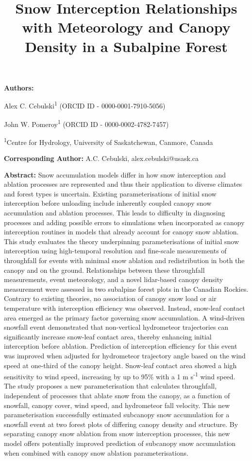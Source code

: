 \documentclass[
  letterpaper,
  DIV=11,
  numbers=noendperiod]{scrartcl}
\title{Snow Interception Relationships with Meteorology and Canopy
Density in a Subalpine Forest}
\author{}
\date{}
\begin{document}
\maketitle



\textbf{Authors:}

Alex C. Cebulski\textsuperscript{1} (ORCID ID - 0000-0001-7910-5056)

John W. Pomeroy\textsuperscript{1} (ORCID ID - 0000-0002-4782-7457)

\textsuperscript{1}Centre for Hydrology, University of Saskatchewan,
Canmore, Canada

\textbf{Corresponding Author:} A.C. Cebulski, alex.cebulski@usask.ca

\textbf{Abstract:} Snow accumulation models differ in how snow
interception and ablation processes are represented and thus their
application to diverse climates and forest types is uncertain. Existing
parameterisations of initial snow interception before unloading include
inherently coupled canopy snow accumulation and ablation processes. This
leads to difficulty in diagnosing processes and adding possible errors
to simulations when incorporated as canopy interception routines in
models that already account for canopy snow ablation. This study
evaluates the theory underpinning parameterisations of initial snow
interception using high-temporal resolution and fine-scale measurements
of throughfall for events with minimal snow ablation and redistribution
in both the canopy and on the ground. Relationships between these
throughfall measurements, event meteorology, and a novel lidar-based
canopy density measurement were assessed in two subalpine forest plots
in the Canadian Rockies. Contrary to existing theories, no association
of canopy snow load or air temperature with interception efficiency was
observed. Instead, snow-leaf contact area emerged as the primary factor
governing snow accumulation. A wind-driven snowfall event demonstrated
that non-vertical hydrometeor trajectories can significantly increase
snow-leaf contact area, thereby enhancing initial interception before
ablation. Prediction of interception efficiency for this event was
improved when adjusted for hydrometeor trajectory angle based on the
wind speed at one-third of the canopy height. Snow-leaf contact area
showed a high sensitivity to wind speed, increasing by up to 95\% with a
1 m s\textsuperscript{-1} wind speed. The study proposes a new
parameterisation that calculates throughfall, independent of processes
that ablate snow from the canopy, as a function of snowfall, canopy
cover, wind speed, and hydrometeor fall velocity. This new
parameterisation successfully estimated subcanopy snow accumulation for
a snowfall event at two forest plots of differing canopy density and
structure. By separating canopy snow ablation from snow interception
processes, this new model offers potentially improved prediction of
subcanopy snow accumulation when combined with canopy snow ablation
parameterisations.
\end{document}
